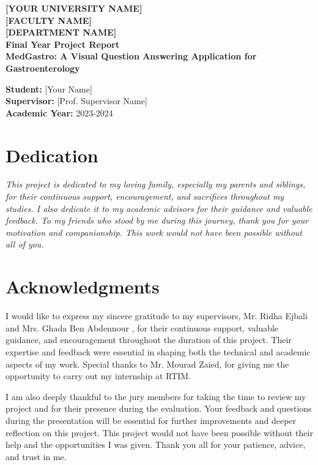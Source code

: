 \documentclass[12pt,a4paper]{report}
\begin{document}
\begin{titlepage}
    \centering
    \vspace*{1cm}
    {\Large \textbf{[YOUR UNIVERSITY NAME]}}\\[0.5cm]
    {\large \textbf{[FACULTY NAME]}}\\[0.5cm]
    {\large \textbf{[DEPARTMENT NAME]}}\\[2cm]
    {\Huge \textbf{Final Year Project Report}}\\[1.5cm]
    {\LARGE \textbf{MedGastro: A Visual Question Answering Application for Gastroenterology}}\\[2cm]
    \begin{flushright}
        \textbf{Student:} [Your Name]\\
        \textbf{Supervisor:} [Prof. Supervisor Name]\\
        \textbf{Academic Year:} 2023-2024
    \end{flushright}
    \vfill
\end{titlepage}
\tableofcontents

\chapter*{Dedication}
\textit{This project is dedicated to my loving family, especially my parents and siblings, for their continuous support, encouragement, and sacrifices throughout my studies. I also dedicate it to my academic advisors for their guidance and valuable feedback. To my friends who stood by me during this journey, thank you for your motivation and companionship. This work would not have been possible without all of you.}

\chapter*{Acknowledgments}
I would like to express my sincere gratitude to my supervisors, Mr. Ridha Ejbali and Mrs. Ghada Ben Abdennour , for their continuous support, valuable guidance, and encouragement throughout the duration of this project. Their expertise and feedback were essential in shaping both the technical and academic aspects of my work.
Special thanks  to Mr. Mourad Zaied, for giving me the opportunity to carry out my internship at RTIM. 

I am also deeply thankful to the jury members for taking the time to review my project and for their presence during the evaluation. Your feedback and questions during the presentation will be essential for further improvements and deeper reflection on this project.
This project would not have been possible without their help and the opportunities I was given. Thank you all for your patience, advice, and trust in me.
\end{document}
